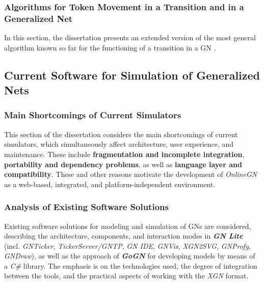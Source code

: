 \subsubsection[Algorithms for Token Movement in a Transition and in a Generalized Net]{Algorithms for Token Movement in a Transition and in a Generalized Net}\label{tokenMove}

\hspace*{2.5em}In this section, the dissertation presents an extended version of the most general algorithm known so far for the functioning of a transition in a GN \cite{DIS-Z1, DIS-Z3, DIS-BAM, DIS-AtanassovSotirova2017}.

\subsection{Current Software for Simulation of Generalized Nets}

\subsubsection{Main Shortcomings of Current Simulators}

\hspace*{2.5em}This section of the dissertation considers the main shortcomings of current simulators, which simultaneously affect architecture, user experience, and maintenance. These include \textbf{fragmentation and incomplete integration}, \textbf{portability and dependency problems}, as well as \textbf{language layer and compatibility}. These and other reasons motivate the development of \textit{OnlineGN} as a web-based, integrated, and platform-independent environment.

\subsubsection{Analysis of Existing Software Solutions}

\hspace*{2.5em}Existing software solutions for modeling and simulation of GNs are considered, describing the architecture, components, and interaction modes in \textbf{\textit{GN Lite}} (incl. \textit{GNTicker}, \textit{TickerServer/GNTP}, \textit{GN IDE}, \textit{GNVis}, \textit{XGN2SVG}, \textit{GNProfy}, \textit{GNDraw}), as well as the approach of \textbf{\textit{GoGN}} for developing models by means of a \textit{C\#} library. The emphasis is on the technologies used, the degree of integration between the tools, and the practical aspects of working with the \textit{XGN} format.

